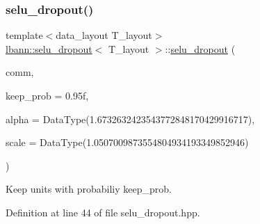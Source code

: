 \subsubsection{\texorpdfstring{selu\+\_\+dropout()}{selu\_dropout()}\hspace{0.1cm}{\footnotesize\ttfamily [1/2]}}
{\footnotesize\ttfamily template$<$data\+\_\+layout T\+\_\+layout$>$ \\
\hyperlink{classlbann_1_1selu__dropout}{lbann\+::selu\+\_\+dropout}$<$ T\+\_\+layout $>$\+::\hyperlink{classlbann_1_1selu__dropout}{selu\+\_\+dropout} (\begin{DoxyParamCaption}\item[{\hyperlink{classlbann_1_1lbann__comm}{lbann\+\_\+comm} $\ast$}]{comm,  }\item[{float}]{keep\+\_\+prob = {\ttfamily 0.95f},  }\item[{Data\+Type}]{alpha = {\ttfamily DataType(1.6732632423543772848170429916717)},  }\item[{Data\+Type}]{scale = {\ttfamily DataType(1.0507009873554804934193349852946)} }\end{DoxyParamCaption})\hspace{0.3cm}{\ttfamily [inline]}}

Keep units with probabiliy keep\+\_\+prob. 

Definition at line 44 of file selu\+\_\+dropout.\+hpp.


